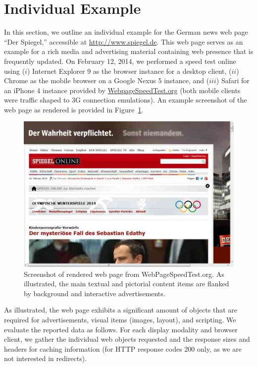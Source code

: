 \documentclass[letterpaper,conference]{IEEEtran}
\begin{document}
\section{Individual Example}
\label{s:example}
In this section, we outline an individual example for the German news web page ``Der Spiegel,'' accessible at \url{http://www.spiegel.de}.
This web page serves as an example for a rich media and advertising material containing web presence that is frequently updated.
On February 12, 2014, we performed a speed test online using ($i$) Internet Explorer 9 as the browser instance for a desktop client, ($ii$) Chrome as the mobile browser on a Google Nexus 5 instance, and ($iii$) Safari for an iPhone 4 instance provided by \url{WebpageSpeedTest.org} (both mobile clients were traffic shaped to 3G connection emulations).
An example screenshot of the web page as rendered is provided in Figure~\ref{fig:screens}.
\begin{figure}
	\centering
	\includegraphics[width=.9\linewidth]{1screen}
	\caption{Screenshot of rendered web page from WebPageSpeedTest.org. As illustrated, the main textual and pictorial content items are flanked by background and interactive advertisements.}
	\label{fig:screens}
\end{figure}
As illustrated, the web page exhibits a significant amount of objects that are required for advertisements, visual items (images, layout), and scripting.
We evaluate the reported data as follows. 
For each display modality and browser client, we gather the individual web objects requested and the response sizes and headers for caching information (for HTTP response codes 200 only, as we are not interested in redirects).
\end{document}
